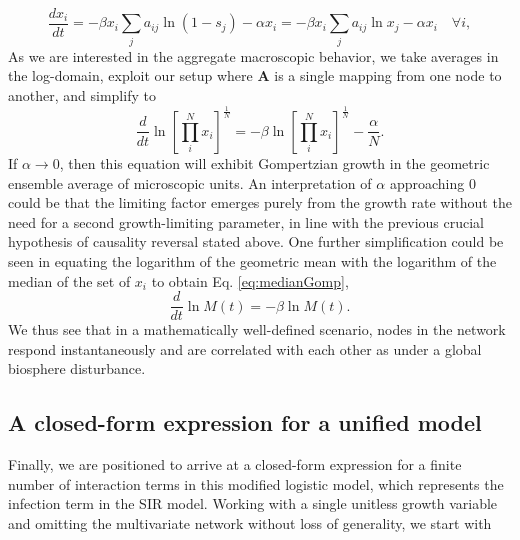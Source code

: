 \documentclass{article}
\begin{document}
\begin{equation}
\frac{d x_i}{dt} = -\beta x_i\sum_j{a_{ij}}\ln{(1 - s_j)} - \alpha x_i = -\beta x_i\sum_j{a_{ij}}\ln{x_j} - \alpha x_i \quad \forall i,
\end{equation}
As we are interested in the aggregate macroscopic behavior, we take averages in the log-domain, exploit our setup where $\mathbf{A}$ is a single mapping from one node to another, and simplify to
\begin{equation}
\frac{d}{{dt}} \ln\left[\prod_i^N{x_i}\right]^{\frac{1}{N}} = -\beta\ln\left[\prod_i^N{x_i}\right]^{\frac{1}{N}} - \frac{\alpha}{N}.
\end{equation}
If $\alpha\rightarrow 0$, then this equation will exhibit Gompertzian growth in the geometric ensemble average of microscopic units. 
An interpretation of $\alpha$ approaching $0$ could be that the limiting factor emerges purely from the growth rate without the need for a second growth-limiting parameter, in line with the previous crucial hypothesis of causality reversal stated above. One further simplification could be seen in equating the logarithm of the geometric mean with the logarithm of the median of the set of $x_i$ to obtain Eq. \ref{eq:medianGomp},
\begin{equation}
\frac{d}{dt}\ln{M(t)} = -\beta \ln{M(t)}.
\end{equation}
We thus see that in a mathematically well-defined scenario, nodes in the network respond instantaneously and are correlated with each other as under a global biosphere disturbance.

\subsection*{A closed-form expression for a unified model}
Finally, we are positioned to arrive at a closed-form expression for a finite number of interaction terms in this modified logistic model, which represents the infection term in the SIR model. Working with a single unitless growth variable and omitting the multivariate network without loss of generality, we start with
\end{document}
